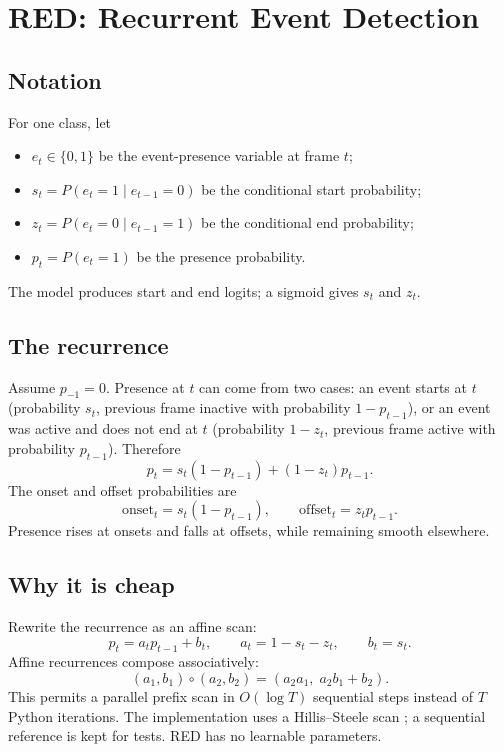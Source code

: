 \section{RED: Recurrent Event Detection}

\subsection{Notation}
For one class, let
\begin{itemize}
\item $e_t\in\{0,1\}$ be the event-presence variable at frame $t$;
\item $s_t=P(e_t=1\mid e_{t-1}=0)$ be the conditional start probability;
\item $z_t=P(e_t=0\mid e_{t-1}=1)$ be the conditional end probability;
\item $p_t=P(e_t=1)$ be the presence probability.
\end{itemize}
The model produces start and end logits; a sigmoid gives $s_t$ and $z_t$.

\subsection{The recurrence}
Assume $p_{-1}=0$. Presence at $t$ can come from two cases: an event starts at
$t$ (probability $s_t$, previous frame inactive with probability $1-p_{t-1}$),
or an event was active and does not end at $t$ (probability $1-z_t$, previous
frame active with probability $p_{t-1}$). Therefore
\begin{equation}
\boxed{p_t = s_t(1-p_{t-1}) + (1-z_t)p_{t-1}}.
\end{equation}
The onset and offset probabilities are
\begin{equation}
\mathrm{onset}_t = s_t(1-p_{t-1}),
\qquad
\mathrm{offset}_t = z_t p_{t-1}.
\end{equation}
Presence rises at onsets and falls at offsets, while remaining smooth
elsewhere.

\subsection{Why it is cheap}
Rewrite the recurrence as an affine scan:
\begin{equation}
p_t = a_t p_{t-1} + b_t,
\qquad
a_t = 1-s_t-z_t,
\qquad
b_t = s_t.
\end{equation}
Affine recurrences compose associatively:
\begin{equation}
(a_1,b_1)\circ(a_2,b_2)
=
(a_2a_1,\; a_2b_1+b_2).
\end{equation}
This permits a parallel prefix scan in $O(\log T)$ sequential steps instead of
$T$ Python iterations. The implementation uses a Hillis--Steele scan \cite{heinsen2023}; a sequential
reference is kept for tests. RED has no learnable parameters.


